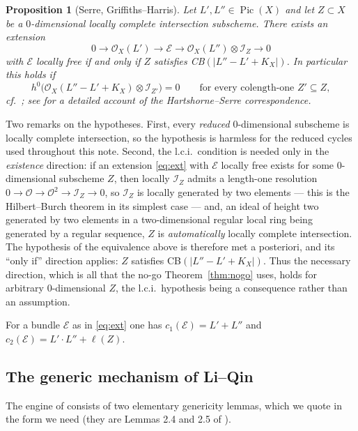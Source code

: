 \documentclass[10pt,a4paper]{amsart}
\newtheorem{proposition}[theorem]{Proposition}
\newcommand{\OO}{\mathcal{O}}
\newcommand{\EE}{\mathcal{E}}
\newcommand{\II}{\mathcal{I}}
\newcommand{\Pic}{\operatorname{Pic}}
\newcommand{\len}{\ell}
\begin{document}
\begin{proposition}[Serre, Griffiths--Harris]\label{prop:CB}
Let $L',L''\in\Pic(X)$ and let $Z\subset X$ be a $0$-dimensional \emph{locally complete intersection} subscheme. There exists an extension
\begin{equation}\label{eq:ext}
0\longrightarrow \OO_X(L')\longrightarrow \EE\longrightarrow \OO_X(L'')\otimes\II_Z\longrightarrow 0
\end{equation}
with $\EE$ \emph{locally free} if and only if $Z$ satisfies \textup{CB}$(|L''-L'+K_X|)$. In particular this holds if
\begin{equation}\label{eq:strongCB}
h^0\bigl(\OO_X(L''-L'+K_X)\otimes\II_{Z'}\bigr)=0\qquad\text{for every colength-one }Z'\subseteq Z,
\end{equation}
cf.\ \cite[Cor.~2.3]{LQ94}; see \cite{Arr07} for a detailed account of the Hartshorne--Serre correspondence.
\end{proposition}

Two remarks on the hypotheses. First, every \emph{reduced} $0$-dimensional subscheme is locally complete intersection, so the hypothesis is harmless for the reduced cycles used throughout this note. Second, the l.c.i.\ condition is needed only in the \emph{existence} direction: if an extension \eqref{eq:ext} with $\EE$ locally free exists for some $0$-dimensional subscheme $Z$, then locally $\II_Z$ admits a length-one resolution $0\to\OO\to\OO^{2}\to\II_Z\to0$, so $\II_Z$ is locally generated by two elements --- this is the Hilbert--Burch theorem in its simplest case \cite[Thm.~20.15]{Eis95} --- and, an ideal of height two generated by two elements in a two-dimensional regular local ring being generated by a regular sequence, $Z$ is \emph{automatically} locally complete intersection. The hypothesis of the equivalence above is therefore met a posteriori, and its ``only if'' direction applies: $Z$ satisfies CB$(|L''-L'+K_X|)$. Thus the necessary direction, which is all that the no-go Theorem~\ref{thm:nogo} uses, holds for arbitrary $0$-dimensional $Z$, the l.c.i.\ hypothesis being a consequence rather than an assumption.

For a bundle $\EE$ as in \eqref{eq:ext} one has $c_1(\EE)=L'+L''$ and $c_2(\EE)=L'\cdot L''+\len(Z)$.

\subsection{The generic mechanism of Li--Qin}\label{subsec:LQ}
The engine of \cite{LQ94} consists of two elementary genericity lemmas, which we quote in the form we need (they are Lemmas 2.4 and 2.5 of \cite{LQ94}).
\end{document}

